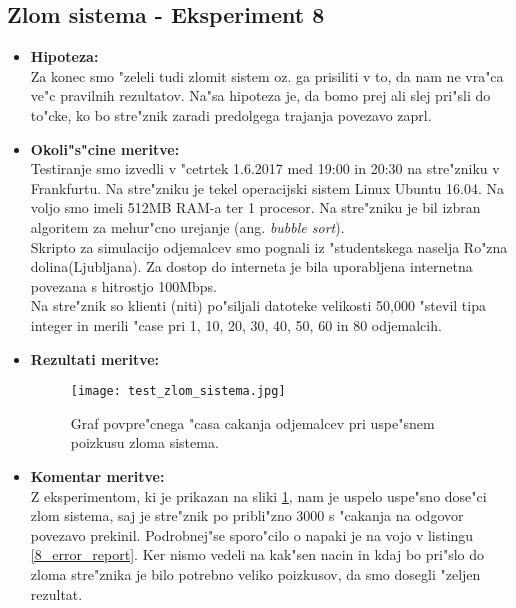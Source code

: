 \subsection{Zlom sistema - Eksperiment 8}
    \begin{itemize}
    	\item \textbf{Hipoteza: }  \\
    		Za konec smo "zeleli tudi zlomit sistem oz. ga prisiliti v to, da nam ne vra"ca ve"c pravilnih rezultatov. Na"sa hipoteza je, da bomo prej ali slej pri"sli do to"cke, ko bo stre"znik zaradi predolgega trajanja povezavo zaprl.

    	\item \textbf{Okoli"s"cine meritve: } \\
    			Testiranje smo izvedli v "cetrtek 1.6.2017 med 19:00 in 20:30 na stre"zniku v Frankfurtu. Na stre"zniku je tekel operacijski sistem Linux Ubuntu 16.04. Na voljo smo imeli 512MB RAM-a ter 1 procesor. Na stre"zniku je bil izbran algoritem za mehur"cno urejanje (ang. \textit{bubble sort}).\\ Skripto za simulacijo odjemalcev smo pognali iz "studentskega naselja Ro"zna dolina(Ljubljana). Za dostop do interneta je bila uporabljena internetna povezana s hitrostjo 100Mbps.\\ Na stre"znik so klienti (niti) po"siljali datoteke velikosti 50,000  "stevil tipa integer in merili "case pri 1, 10, 20, 30, 40, 50, 60 in 80 odjemalcih.

     	\item \textbf{Rezultati meritve: }  \\
    		\begin{figure}[h!]
  		\centering
  		  \texttt{[image: test\_zlom\_sistema.jpg]}
  		\caption{Graf povpre"cnega "casa cakanja odjemalcev pri uspe"snem poizkusu zloma sistema. }
  		\label{8_graf_zlom_sistema}
		\end{figure}
    		 \newpage
    	\item \textbf{Komentar meritve: } \\
    		Z eksperimentom, ki je prikazan na sliki \ref{8_graf_zlom_sistema}, nam je uspelo uspe"sno dose"ci zlom sistema, saj je stre"znik po pribli"zno 3000 s "cakanja na odgovor povezavo prekinil. Podrobnej"se sporo"cilo o napaki je na vojo v listingu \ref{8_error_report}.
		Ker nismo vedeli na kak"sen nacin in kdaj bo pri"slo do zloma stre"znika je bilo potrebno veliko poizkusov, da smo dosegli "zeljen rezultat.


\end{itemize}
